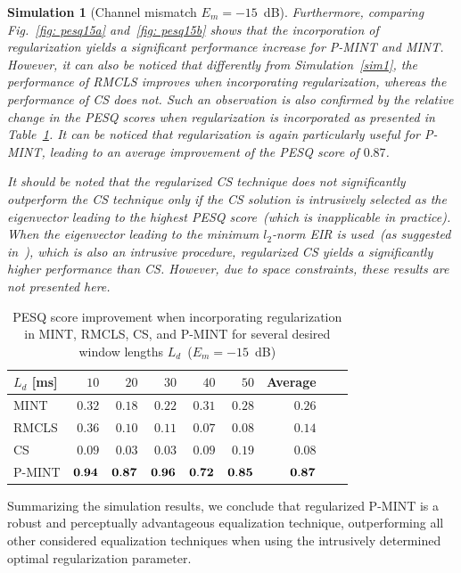\documentclass[10pt]{IEEEtran}
\newtheorem{simulation}{Simulation}
\begin{document}
\begin{simulation}[Channel mismatch $E_m=-15$~dB]
Furthermore, comparing Fig.~\ref{fig: pesq15a} and~\ref{fig: pesq15b} shows that the incorporation of regularization yields a significant performance increase for P-MINT and MINT.
However, it can also be noticed that differently from Simulation~\ref{sim1}, the performance of RMCLS improves when incorporating regularization, whereas the performance of CS does not.
Such an observation is also confirmed by the relative change in the PESQ scores when regularization is incorporated as presented in Table~\ref{tbl: pesq2}.
It can be noticed that regularization is again particularly useful for P-MINT, leading to an average improvement of the PESQ score of $0.87$.

It should be noted that the regularized CS technique does not significantly outperform the CS technique only if the CS solution is intrusively selected as the eigenvector leading to the highest PESQ score~(which is inapplicable in practice). When the eigenvector leading to the minimum $l_2$-norm EIR is used~(as suggested in~\cite{Zhang_IWAENC_2010}), which is also an intrusive procedure, regularized CS yields a significantly higher performance than CS. However, due to space constraints, these results are not presented here.
\end{simulation}
\begin{table}[b]
\centering
\caption{PESQ score improvement when incorporating regularization in MINT, RMCLS, CS, and P-MINT for several desired window lengths $L_d$~($E_m = -15$~dB)}
\label{tbl: pesq2}
\begin{tabular}{|l|r|r|r|r|r|r|r|r|}
\hline
$L_d$ [ms] & $10$ & $20$ & $30$ & $40$ & $50$ & Average  \\
\hline
MINT & $0.32$ & $0.18$ & $0.22$ & $0.31$ & $0.28$ & $0.26$ \\
\hline
RMCLS & $0.36$ & $0.10$ & $0.11$ & $0.07$ & $0.08$ & $0.14$ \\
\hline
CS & $0.09$ & $0.03$ & $0.03$ & $0.09$ & $0.19$ & $0.08$ \\
\hline
P-MINT & $\bf{0.94}$ & $\bf{0.87}$ & $\bf{0.96}$ & $\bf{0.72}$ & $\bf{0.85}$ & $\bf{0.87}$ \\
\hline
\end{tabular}
\end{table}



Summarizing the simulation results, we conclude that regularized P-MINT is a robust and perceptually advantageous equalization technique, outperforming all other considered equalization techniques when using the intrusively determined optimal regularization parameter.
\end{document}
